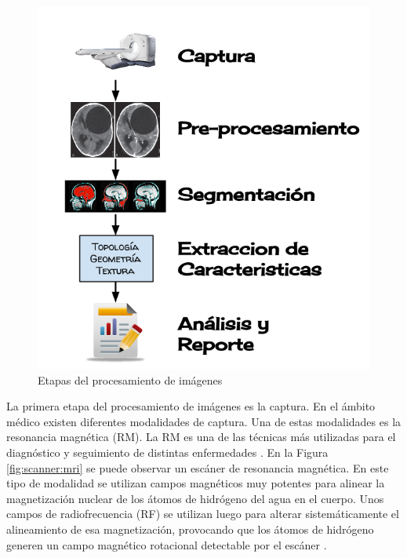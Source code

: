 \begin{figure}[H]
\centering
\includegraphics[scale=0.3]{images/procesamiento.png}
\caption{Etapas del procesamiento de imágenes}
\label{fig:etapas_del_procesamiento}
\end{figure}

La primera etapa del procesamiento de imágenes es la captura. En el ámbito médico existen diferentes modalidades de captura. Una de estas modalidades es la resonancia magnética (RM). La RM es una de las técnicas más utilizadas para el diagnóstico y seguimiento de distintas enfermedades \citep{prince2006medical}. En la Figura \ref{fig:scanner:mri} se puede observar un escáner de resonancia magnética.  En este tipo de modalidad se utilizan campos magnéticos muy potentes para alinear la magnetización nuclear de los átomos  de hidrógeno del agua en el cuerpo. Unos campos de radiofrecuencia (RF) se utilizan luego para alterar sistemáticamente el alineamiento de esa magnetización, provocando que los átomos de hidrógeno generen un campo magnético rotacional detectable por el escáner \citep{novelline2004squire}.

